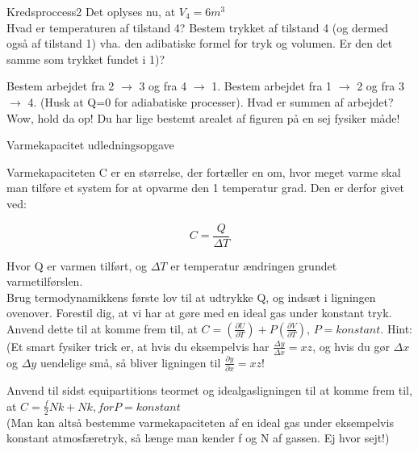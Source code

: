\documentclass[crop=false, class=memoir]{standalone}
\begin{document}
\begin{opgave}{Kredsproccess2}
\noindent
Det oplyses nu, at $V_4=6m^3$ \\

\opg Hvad er temperaturen af tilstand 4?
\opg Bestem trykket af tilstand 4 (og dermed også af tilstand 1)  vha. den adibatiske formel for tryk og volumen. Er den det samme som trykket fundet i 1)?

\opg Bestem arbejdet fra 2 $\longrightarrow$ 3 og fra 4 $\longrightarrow$ 1.  
\opg Bestem arbejdet fra 1 $\longrightarrow$ 2 og fra 3 $\longrightarrow$ 4. (Husk at Q=0 for adiabatiske processer).
\opg Hvad er summen af arbejdet? Wow, hold da op! Du har lige bestemt arealet af figuren på en sej fysiker måde!

\end{opgave}

\begin{opgave}{Varmekapacitet udledningsopgave}

\noindent
Varmekapaciteten C er en størrelse, der fortæller en om, hvor meget varme skal man tilføre et system for at opvarme den 1 temperatur grad. Den er derfor givet ved:

\begin{equation*}
    C=\frac{Q}{\Delta T}
\end{equation*}

\noindent
Hvor Q er varmen tilført, og $\Delta T$ er temperatur ændringen grundet varmetilførslen. \\

\opg Brug termodynamikkens første lov til at udtrykke Q, og indsæt i ligningen ovenover.
\opg Forestil dig, at vi har at gøre med en ideal gas under konstant tryk. Anvend dette til at komme frem til, at $C=(\frac{\partial U}{\partial T})+P(\frac{\partial V}{\partial T}), \, P=konstant$. Hint: (Et smart fysiker trick er, at hvis du eksempelvis har $\frac{\Delta y}{\Delta x}=xz$, og hvis du gør $\Delta x$ og $\Delta y$ uendelige små, så bliver ligningen til $\frac{\partial y}{\partial x}=xz$!

\opg Anvend til sidst equipartitions teormet og idealgasligningen til at komme frem til, at $C=\frac{f}{2}Nk+Nk, for P=konstant$ \\

\noindent
(Man kan altså bestemme varmekapaciteten af en ideal gas under eksempelvis konstant atmosfæretryk, så længe man kender f og N af gassen. Ej hvor sejt!)

\end{opgave}
\end{document}

